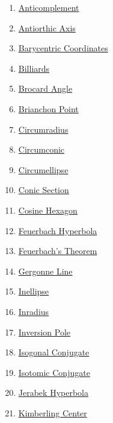\documentclass[]{article}
\providecommand{\tightlist}{%
  \setlength{\itemsep}{0pt}\setlength{\parskip}{0pt}}
\begin{document}
\begin{enumerate}
\def\labelenumi{\arabic{enumi}.}
\tightlist
\item
  \href{http://mathworld.wolfram.com/Anticomplement.html}{Anticomplement}
\item
  \href{http://mathworld.wolfram.com/AntiorthicAxis.html}{Antiorthic Axis}
\item
  \href{http://mathworld.wolfram.com/BarycentricCoordinates.html}{Barycentric Coordinates}
\item
  \href{http://mathworld.wolfram.com/Billiards.html}{Billiards}
\item
  \href{http://mathworld.wolfram.com/BrocardAngle.html}{Brocard Angle}
\item
  \href{http://mathworld.wolfram.com/BrianchonPoint.html}{Brianchon Point}
\item
  \href{http://mathworld.wolfram.com/Circumradius.html}{Circumradius}
\item
  \href{http://mathworld.wolfram.com/Circumconic.html}{Circumconic}
\item
  \href{http://mathworld.wolfram.com/Circumellipse.html}{Circumellipse}
\item
  \href{http://mathworld.wolfram.com/ConicSection.html}{Conic Section}
\item
  \href{http://mathworld.wolfram.com/CosineCircle.html}{Cosine Hexagon}
\item
  \href{http://mathworld.wolfram.com/FeuerbachHyperbola.html}{Feuerbach Hyperbola}
\item
  \href{http://mathworld.wolfram.com/FeuerbachsTheorem.html}{Feuerbach's Theorem}
\item
  \href{http://mathworld.wolfram.com/GergonneLine.html}{Gergonne Line}
\item
  \href{http://mathworld.wolfram.com/Inellipse.html}{Inellipse}
\item
  \href{http://mathworld.wolfram.com/Inradius.html}{Inradius}
\item
  \href{http://mathworld.wolfram.com/InversionPole.html}{Inversion Pole}
\item
  \href{http://mathworld.wolfram.com/IsogonalConjugate.html}{Isogonal Conjugate}
\item
  \href{http://mathworld.wolfram.com/IsogotomicConjugate.html}{Isotomic Conjugate}
\item
  \href{http://mathworld.wolfram.com/JerabekHyperbola.html}{Jerabek Hyperbola}
\item
  \href{http://mathworld.wolfram.com/KimberlingCenter.html}{Kimberling Center}

\end{enumerate}
\end{document}
